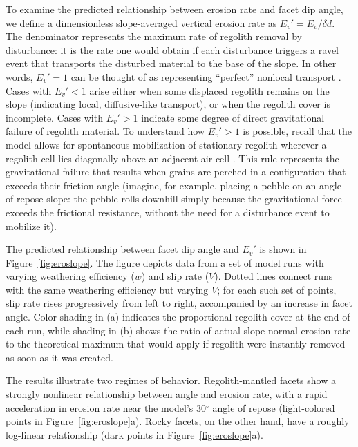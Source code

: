 To examine the predicted relationship between erosion rate and facet dip angle, we define a dimensionless slope-averaged vertical erosion rate as $E_v' = E_v / \delta d$. The denominator represents the maximum rate of regolith removal by disturbance: it is the rate one would obtain if each disturbance triggers a ravel event that transports the disturbed material to the base of the slope. In other words, $E_v' = 1$ can be thought of as representing ``perfect'' nonlocal transport \citep[e.g.,][]{tucker2010trouble,doane2018nonlocal}. Cases with $E_v'<1$ arise either when some displaced regolith remains on the slope (indicating local, diffusive-like transport), or when the regolith cover is incomplete. Cases with $E_v'>1$ indicate some degree of direct gravitational failure of regolith material. To understand how $E_v'>1$ is possible, recall that the model allows for spontaneous mobilization of stationary regolith wherever a regolith cell lies diagonally above an adjacent air cell \citep[][, their Figures 14 and 15]{tucker2016celllab}. This rule represents the gravitational failure that results when grains are perched in a configuration that exceeds their friction angle (imagine, for example, placing a pebble on an angle-of-repose slope: the pebble rolls downhill simply because the gravitational force exceeds the frictional resistance, without the need for a disturbance event to mobilize it).

The predicted relationship between facet dip angle and $E_v'$ is shown in Figure~\ref{fig:eroslope}.  The figure depicts data from a set of model runs with varying weathering efficiency ($w$) and slip rate ($V$). Dotted lines connect runs with the same weathering efficiency but varying $V$; %
for each such set of points, slip rate rises progressively from left to right, accompanied by an increase in facet angle. Color shading in (a) indicates the proportional regolith cover at the end of each run, while shading in (b) shows the ratio of actual slope-normal erosion rate to the theoretical maximum that would apply if regolith were instantly removed as soon as it was created. 

The results illustrate two regimes of behavior. Regolith-mantled facets show a strongly nonlinear relationship between angle and erosion rate, with a rapid acceleration in erosion rate near the model's 30$^\circ$ angle of repose (light-colored points in Figure~\ref{fig:eroslope}a). Rocky facets, on the other hand, have a roughly log-linear relationship (dark points in Figure~\ref{fig:eroslope}a).

